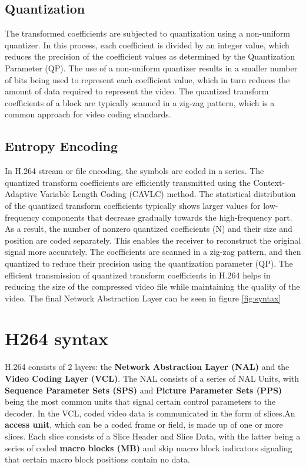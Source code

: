\subsection{Quantization}
The transformed coefficients are subjected to quantization using a non-uniform quantizer. In this process, each coefficient is divided by an integer value, which reduces the precision of the coefficient values as determined by the Quantization Parameter (QP). The use of a non-uniform quantizer results in a smaller number of bits being used to represent each coefficient value, which in turn reduces the amount of data required to represent the video. The quantized transform coefficients of a block are typically scanned in a zig-zag pattern, which is a common approach for video coding standards.


\subsection{Entropy Encoding}
In H.264 stream or file encoding, the symbols are coded in a series. The quantized transform coefficients are efficiently transmitted using the Context-Adaptive Variable Length Coding (CAVLC) method. The statistical distribution of the quantized transform coefficients typically shows larger values for low-frequency components that decrease gradually towards the high-frequency part. As a result, the number of nonzero quantized coefficients (N) and their size and position are coded separately. This enables the receiver to reconstruct the original signal more accurately. The coefficients are scanned in a zig-zag pattern, and then quantized to reduce their precision using the quantization parameter (QP). The efficient transmission of quantized transform coefficients in H.264 helps in reducing the size of the compressed video file while maintaining the quality of the video. The final Network Abstraction Layer can be seen in figure \ref{fig:syntax}


\section{H264 syntax}
H.264 consists of 2 layers: the \textbf{Network Abstraction Layer (NAL)} and the \textbf{Video Coding Layer (VCL)}. The NAL consists of a series of NAL Units, with \textbf{Sequence Parameter Sets (SPS)} and \textbf{Picture Parameter Sets (PPS)} being the most common units that signal certain control parameters to the decoder. In the VCL, coded video data is communicated in the form of slices.An \textbf{access unit}, which can be a coded frame or field, is made up of one or more slices. Each slice consists of a Slice Header and Slice Data, with the latter being a series of coded \textbf{macro blocks (MB)} and skip macro block indicators signaling that certain macro block positions contain no data.

